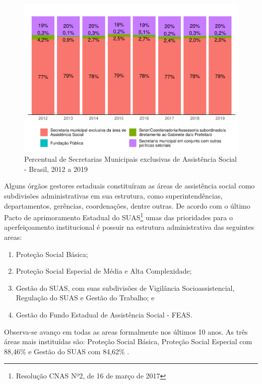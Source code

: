 \documentclass[
  brazilian]{report}
\providecommand{\tightlist}{%
  \setlength{\itemsep}{0pt}\setlength{\parskip}{0pt}}
\begin{document}
\begin{figure}
\includegraphics{Censo-SUAS-2022_files/figure-latex/sec-munic-exc-1} \caption[Percentual de Secretarias Municipais exclusivas de Assistência Social - Brasil, 2012 a 2019]{Percentual de Secretarias Municipais exclusivas de Assistência Social - Brasil, 2012 a 2019}\label{fig:sec-munic-exc}
\end{figure}

Alguns órgãos gestores estaduais constituíram as áreas de assistência
social como subdivisões administrativas em sua estrutura, como
superintendências, departamentos, gerências, coordenações, dentre
outras. De acordo com o último Pacto de aprimoramento Estadual do
SUAS\footnote{Resolução CNAS Nº2, de 16 de março de 2017} umas das
prioridades para o aperfeiçoamento institucional é possuir na estrutura
administrativa das seguintes areas:

\begin{enumerate}
\def\labelenumi{\arabic{enumi})}
\tightlist
\item
  Proteção Social Básica;
\item
  Proteção Social Especial de Média e Alta Complexidade;
\item
  Gestão do SUAS, com suas subdivisões de Vigilância Socioassistencial,
  Regulação do SUAS e Gestão do Trabalho; e
\item
  Gestão do Fundo Estadual de Assistência Social - FEAS.
\end{enumerate}

Observa-se avanço em todas as areas formalmente nos últimos 10 anos. As
três áreas mais instituídas são: Proteção Social Básica, Proteção Social
Especial com 88,46\% e Gestão do SUAS com 84,62\% .
\end{document}
